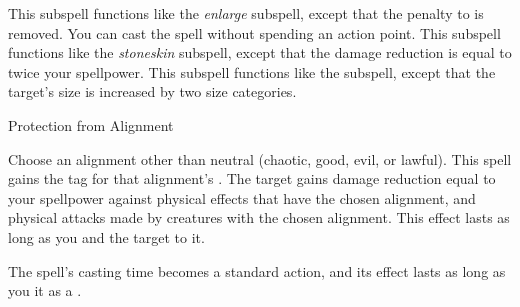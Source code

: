This subspell functions like the \textit{enlarge} subspell, except that the penalty to  is removed.
You can cast the spell without spending an action point.
This subspell functions like the \textit{stoneskin} subspell, except that the damage reduction is equal to twice your spellpower.
This subspell functions like the  subspell, except that the target's size is increased by two size categories.
\begin{spellsection}{Protection from Alignment}
\begin{spellcontent}
\begin{spelltargetinginfo}
\end{spelltargetinginfo}
\begin{spelleffects}
\spellspecial
Choose an alignment other than neutral (chaotic, good, evil, or lawful).
This spell gains the tag for that alignment's .
\spelleffect
The target gains damage reduction equal to your spellpower against physical effects that have the chosen alignment, and physical attacks made by creatures with the chosen alignment.
This effect lasts as long as you and the target  to it.
\end{spelleffects}
\end{spellcontent}
\begin{spellfooter}
\end{spellfooter}
\begin{spellsubcontent}
\begin{spellcantrip}
The spell's casting time becomes a standard action, and its effect lasts as long as you  it as a .
\end{spellcantrip}
\end{spellsubcontent}
\end{spellsection}
